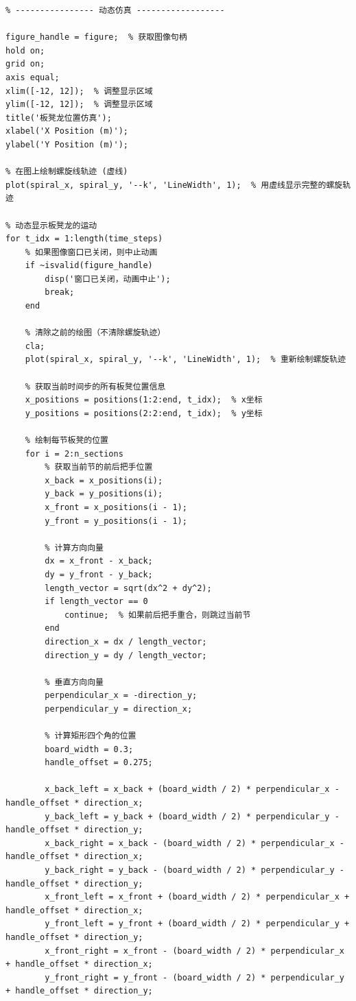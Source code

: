 \documentclass{cumcmthesis1}
\begin{document}
\begin{lstlisting}[caption={问题2中对板凳龙运动及碰撞进行模拟的代码}, label={lst:third_code}]
% 位置数据生成完成后，直接用于分析和绘图
% ---------------- 动态仿真 ------------------

figure_handle = figure;  % 获取图像句柄
hold on;
grid on;
axis equal;
xlim([-12, 12]);  % 调整显示区域
ylim([-12, 12]);  % 调整显示区域
title('板凳龙位置仿真');
xlabel('X Position (m)');
ylabel('Y Position (m)');

% 在图上绘制螺旋线轨迹 (虚线)
plot(spiral_x, spiral_y, '--k', 'LineWidth', 1);  % 用虚线显示完整的螺旋轨迹

% 动态显示板凳龙的运动
for t_idx = 1:length(time_steps)
    % 如果图像窗口已关闭，则中止动画
    if ~isvalid(figure_handle)
        disp('窗口已关闭，动画中止');
        break;
    end
    
    % 清除之前的绘图（不清除螺旋轨迹）
    cla;
    plot(spiral_x, spiral_y, '--k', 'LineWidth', 1);  % 重新绘制螺旋轨迹
    
    % 获取当前时间步的所有板凳位置信息
    x_positions = positions(1:2:end, t_idx);  % x坐标
    y_positions = positions(2:2:end, t_idx);  % y坐标
    
    % 绘制每节板凳的位置
    for i = 2:n_sections
        % 获取当前节的前后把手位置
        x_back = x_positions(i);
        y_back = y_positions(i);
        x_front = x_positions(i - 1);
        y_front = y_positions(i - 1);
        
        % 计算方向向量
        dx = x_front - x_back;
        dy = y_front - y_back;
        length_vector = sqrt(dx^2 + dy^2);
        if length_vector == 0
            continue;  % 如果前后把手重合，则跳过当前节
        end
        direction_x = dx / length_vector;
        direction_y = dy / length_vector;
        
        % 垂直方向向量
        perpendicular_x = -direction_y;
        perpendicular_y = direction_x;
        
        % 计算矩形四个角的位置
        board_width = 0.3;
        handle_offset = 0.275;
        
        x_back_left = x_back + (board_width / 2) * perpendicular_x - handle_offset * direction_x;
        y_back_left = y_back + (board_width / 2) * perpendicular_y - handle_offset * direction_y;
        x_back_right = x_back - (board_width / 2) * perpendicular_x - handle_offset * direction_x;
        y_back_right = y_back - (board_width / 2) * perpendicular_y - handle_offset * direction_y;
        x_front_left = x_front + (board_width / 2) * perpendicular_x + handle_offset * direction_x;
        y_front_left = y_front + (board_width / 2) * perpendicular_y + handle_offset * direction_y;
        x_front_right = x_front - (board_width / 2) * perpendicular_x + handle_offset * direction_x;
        y_front_right = y_front - (board_width / 2) * perpendicular_y + handle_offset * direction_y;
        

\end{lstlisting}
\end{document}
